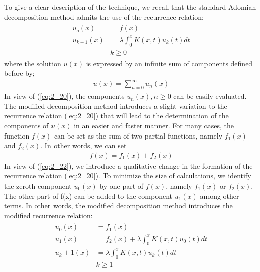 \documentclass[11pt]{report}
\newcommand{\sps}{\\[0.2cm]}
\newcommand{\refn}[1]{(\ref{#1})}
\newcommand{\refx}[1]{\refn{eq:#1}}
\newcommand{\NI}{\noindent}
\begin{document}
	\NI To give a clear description of the technique, we recall that the standard Adomian decomposition method admits the use of the recurrence relation:
	\begin{eqnarray}
		\begin{split}
			u_o(x) &= f(x)\sps
			u_{k+1}(x) &= \lambda\int_{0}^{x} K(x,t) u_k(t) dt\sps
			&k \geq 0
		\end{split}\label{eq:2_20}
	\end{eqnarray}
	where the solution $u(x)$ is expressed by an infinite sum of components defined before by;\\
	\begin{eqnarray}
		u(x) = \sum_{n=0}^{\infty}  u_n(x)
	\end{eqnarray}
	In view of \refx{2_20}, the components $u_n(x),n\geq 0$ can be easily evaluated. The modified decomposition method introduces a slight variation to the recurrence relation \refx{2_20} that will lead to the determination of the components of $u(x)$ in an easier and faster manner. For many cases, the function $f(x)$ can be set as the sum of two partial functions, namely $f_1(x)$ and $f_2(x)$. In other words, we can set
	\begin{eqnarray}
		f(x) = f_1(x) + f_2(x)\label{eq:2_22}
	\end{eqnarray}
	In view of \refx{2_22}, we introduce a qualitative change in the formation of the recurrence relation \refx{2_20}. To minimize the size of calculations, we identify the zeroth component $u_0(x)$ by one part of $f(x)$, namely $f_1(x)$ or $f_2(x)$. The other part of f(x) can be added to the component $u_1(x)$ among other terms. In other words, the modified decomposition method introduces the modified recurrence relation: 
	\begin{eqnarray}
		\begin{split}
			u_0(x) &= f_1(x)\sps
			u_1(x) &= f_2(x) + \lambda\int_{0}^{x} K(x,t) u_0(t) dt\sps
			u_k+1(x) &= \lambda\int_{0}^{x} K(x,t) u_k(t) dt\sps
			&k \geq 1
		\end{split}\label{eq:2_23}
	\end{eqnarray}
	
\end{document}
